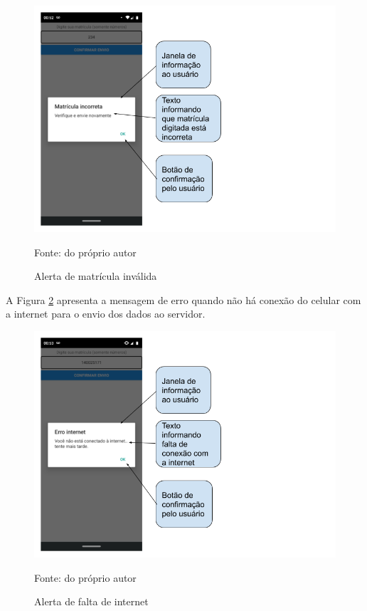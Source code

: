 \begin{figure}[H]
\centering
\caption{Alerta de matrícula inválida}
\includegraphics[scale=0.5]{figuras/estatisticas/matricula_incorreta.png}

\label{matricula_incorreta}
\small{Fonte: do próprio autor}
\end{figure}

A Figura \ref{sem_internet} apresenta a mensagem de erro quando não há conexão do celular com a internet para o envio dos dados ao servidor.

\begin{figure}[H]
\centering
\caption{Alerta de falta de internet}
\includegraphics[scale=0.5]{figuras/estatisticas/sem_internet.png}

\label{sem_internet}
\small{Fonte: do próprio autor}
\end{figure}

